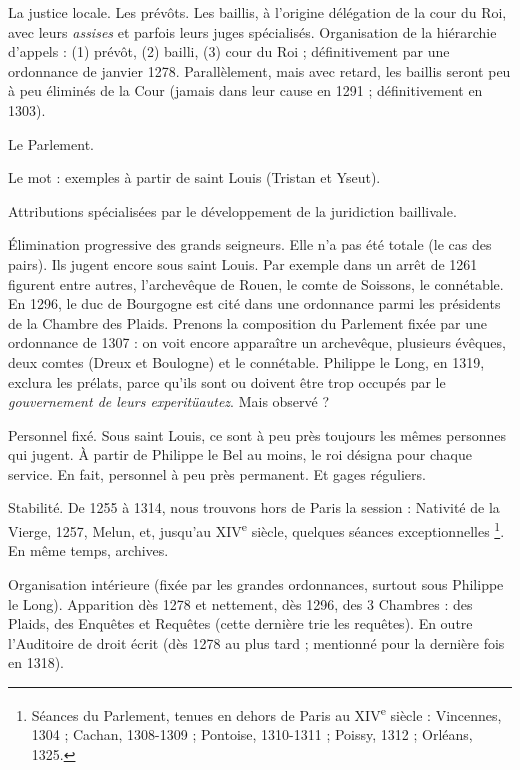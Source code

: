 \documentclass[french,twoside]{book} %
\begin{document}
\begin{listalpha}[itemsep=0pt,]
\item La justice locale. Les prévôts. Les baillis, à l’origine délégation de la cour du Roi, avec leurs \emph{assises} et parfois leurs juges spécialisés. Organisation de la hiérarchie d’appels : (1) prévôt, (2) bailli, (3) cour du Roi ; définitivement par une ordonnance de janvier 1278. Parallèlement, mais avec retard, les baillis seront peu à peu éliminés de la Cour (jamais dans leur cause en 1291 ; définitivement en 1303).
\item Le Parlement.

\end{listalpha}\noindent Le mot : exemples à partir de saint Louis (Tristan et Yseut).\par
Attributions spécialisées par le développement de la juridiction baillivale.\par
Élimination progressive des grands seigneurs. Elle n’a pas été totale (le cas des pairs). Ils jugent encore sous saint Louis. Par exemple dans un arrêt de 1261 figurent entre autres, l’archevêque de Rouen, le comte de Soissons, le connétable. En 1296, le duc de Bourgogne est cité dans une ordonnance parmi les présidents de la Chambre des Plaids. Prenons la composition du Parlement fixée par une ordonnance de 1307 : on voit encore apparaître un archevêque, plusieurs évêques, deux comtes (Dreux et Boulogne) et le connétable. Philippe le Long, en 1319, exclura les prélats, parce qu’ils sont ou  
\label{p44} doivent être trop occupés par le \emph{gouvernement de leurs experitüautez}. Mais observé ?\par
Personnel fixé. Sous saint Louis, ce sont à peu près toujours les mêmes personnes qui jugent. À partir de Philippe le Bel au moins, le roi désigna pour chaque service. En fait, personnel à peu près permanent. Et gages réguliers.\par
Stabilité. De 1255 à 1314, nous trouvons hors de Paris la session : Nativité de la Vierge, 1257, Melun, et, jusqu’au XIV\textsuperscript{e} siècle, quelques séances exceptionnelles \footnote{ Séances du Parlement, tenues en dehors de Paris au XIV\textsuperscript{e} siècle : Vincennes, 1304 ; Cachan, 1308-1309 ; Pontoise, 1310-1311 ; Poissy, 1312 ; Orléans, 1325.}. En même temps, archives.\par
Organisation intérieure (fixée par les grandes ordonnances, surtout sous Philippe le Long). Apparition dès 1278 et nettement, dès 1296, des 3 Chambres : des Plaids, des Enquêtes et Requêtes (cette dernière trie les requêtes). En outre l’Auditoire de droit écrit (dès 1278 au plus tard ; mentionné pour la dernière fois en 1318).\par
\end{document}
